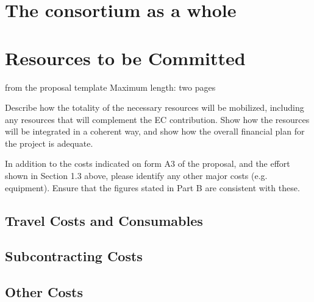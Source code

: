

\section{The {\protect\pn} consortium as a whole}\label{sec:consortium}


\section{Resources to be Committed}\label{sec:resources}
\begin{todo}{from the proposal template}
Maximum length: two pages

Describe how the totality of the necessary resources will be mobilized, including any resources that
will complement the EC contribution. Show how the resources will be integrated in a coherent way,
and show how the overall financial plan for the project is adequate.

In addition to the costs indicated on form A3 of the proposal, and the effort shown in Section 1.3
above, please identify any other major costs (e.g. equipment). Ensure that the figures stated in Part B
are consistent with these.
\end{todo}

\subsection{Travel Costs and Consumables}\label{sec:travel-costs}
\subsection{Subcontracting Costs}
\subsection{Other Costs}


